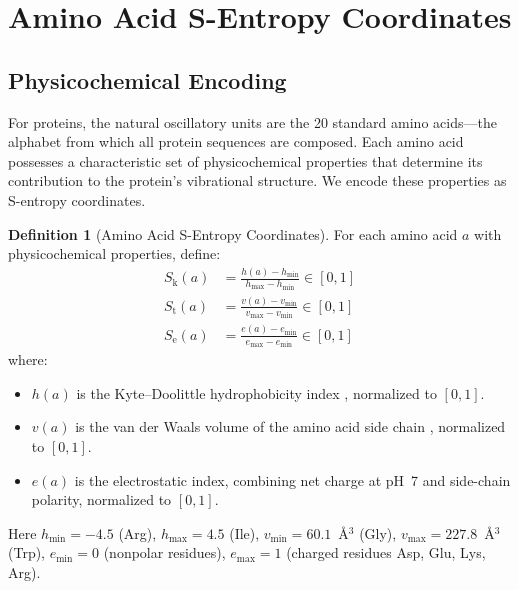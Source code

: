 \documentclass[11pt,twocolumn,a4paper]{article}
\theoremstyle{definition}
\newtheorem{definition}[theorem]{Definition}
\theoremstyle{remark}
\newcommand{\Sk}{S_{\mathrm{k}}}
\newcommand{\St}{S_{\mathrm{t}}}
\newcommand{\Se}{S_{\mathrm{e}}}
\begin{document}
\section{Amino Acid S-Entropy Coordinates}
\label{sec:amino_acid_coordinates}

\subsection{Physicochemical Encoding}

For proteins, the natural oscillatory units are the 20 standard amino acids---the alphabet from which all protein sequences are composed. Each amino acid possesses a characteristic set of physicochemical properties that determine its contribution to the protein's vibrational structure. We encode these properties as S-entropy coordinates.

\begin{definition}[Amino Acid S-Entropy Coordinates]
\label{def:aa_coords}
For each amino acid $a$ with physicochemical properties, define:
\begin{align}
\Sk(a) &= \frac{h(a) - h_{\min}}{h_{\max} - h_{\min}} \in [0,1] \label{eq:sk_aa} \\
\St(a) &= \frac{v(a) - v_{\min}}{v_{\max} - v_{\min}} \in [0,1] \label{eq:st_aa} \\
\Se(a) &= \frac{e(a) - e_{\min}}{e_{\max} - e_{\min}} \in [0,1] \label{eq:se_aa}
\end{align}
where:
\begin{itemize}[nosep]
\item $h(a)$ is the Kyte--Doolittle hydrophobicity index \citep{kyte1982}, normalized to $[0,1]$.
\item $v(a)$ is the van der Waals volume of the amino acid side chain \citep{creighton1993}, normalized to $[0,1]$.
\item $e(a)$ is the electrostatic index, combining net charge at pH~7 and side-chain polarity, normalized to $[0,1]$.
\end{itemize}
Here $h_{\min} = -4.5$ (Arg), $h_{\max} = 4.5$ (Ile), $v_{\min} = 60.1$~\AA$^3$ (Gly), $v_{\max} = 227.8$~\AA$^3$ (Trp), $e_{\min} = 0$ (nonpolar residues), $e_{\max} = 1$ (charged residues Asp, Glu, Lys, Arg).
\end{definition}
\end{document}
